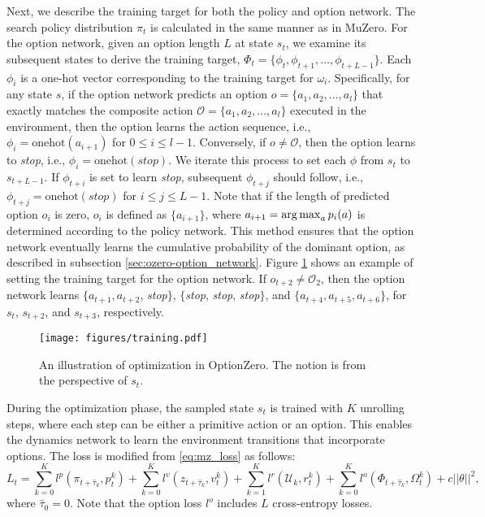 Next, we describe the training target for both the policy and option network.
The search policy distribution $\pi_t$ is calculated in the same manner as in MuZero.
For the option network, given an option length $L$ at state $s_t$, we examine its subsequent states to derive the training target, $\Phi_t=\{\phi_t, \phi_{t+1}, ..., \phi_{t+L-1}\}$.
Each $\phi_i$ is a one-hot vector corresponding to the training target for $\omega_i$.
Specifically, for any state $s$, if the option network predicts an option $o=\{a_1, a_2, ..., a_l\}$ that exactly matches the composite action $\mathcal{O}=\{a_1, a_2, ..., a_l\}$ executed in the environment, then the option learns the action sequence, i.e., $\phi_i=\text{onehot}(a_{i+1})$ for $0\leq i\leq l-1$.
Conversely, if $o\neq \mathcal{O}$, then the option learns to \textit{stop}, i.e., $\phi_i=\text{onehot}(stop)$.
We iterate this process to set each $\phi$ from $s_t$ to $s_{t+L-1}$.
If $\phi_{t+i}$ is set to learn \textit{stop}, subsequent $\phi_{t+j}$ should follow, i.e., $\phi_{t+j}=\text{onehot}(stop)$ for $i \leq j \leq L-1$.
Note that if the length of predicted option $o_i$ is zero, $o_i$ is defined as $\{a_{i+1}\}$, where $a_{i+1}=\operatorname*{arg\,max}_a p_i(a)$ is determined according to the policy network.
This method ensures that the option network eventually learns the cumulative probability of the dominant option, as described in subsection \ref{sec:ozero-option_network}.
Figure \ref{fig:training} shows an example of setting the training target for the option network.
If $o_{t+2}\neq\mathcal{O}_2$, then the option network learns $\{a_{t+1}, a_{t+2}$, \textit{stop}$\}$, $\{$\textit{stop}, \textit{stop}, \textit{stop}$\}$, and $\{a_{t+4}, a_{t+5}, a_{t+6}\}$, for $s_t$, $s_{t+2}$, and $s_{t+3}$, respectively.

\begin{figure}[h]
    \centering
    \texttt{[image: figures/training.pdf]}
    \caption{An illustration of optimization in OptionZero. The notion is from the perspective of $s_t$.}
    \label{fig:training}
\end{figure}

During the optimization phase, the sampled state $s_t$ is trained with $K$ unrolling steps, where each step can be either a primitive action or an option.
This enables the dynamics network to learn the environment transitions that incorporate options.
The loss is modified from \eqref{eq:mz_loss} as follows:
\begin{equation}\label{eq:oz_loss}
    L_t=
    \sum_{k=0}^{K} l^{p}(\pi_{t+\hat{\tau}_k},p^k_t)+
    \sum_{k=0}^{K} l^{v}(z_{t+\hat{\tau}_k},v^k_t)+
    \sum_{k=1}^{K} l^{r}(\mathcal{U}_k,r^k_t)+
    \sum_{k=0}^{K} l^{o}(\Phi_{t+\hat{\tau}_k},\Omega^k_t)+
    c||\theta||^{2},
\end{equation}
where $\hat{\tau}_0=0$.
Note that the option loss $l^{o}$ includes $L$ cross-entropy losses.

